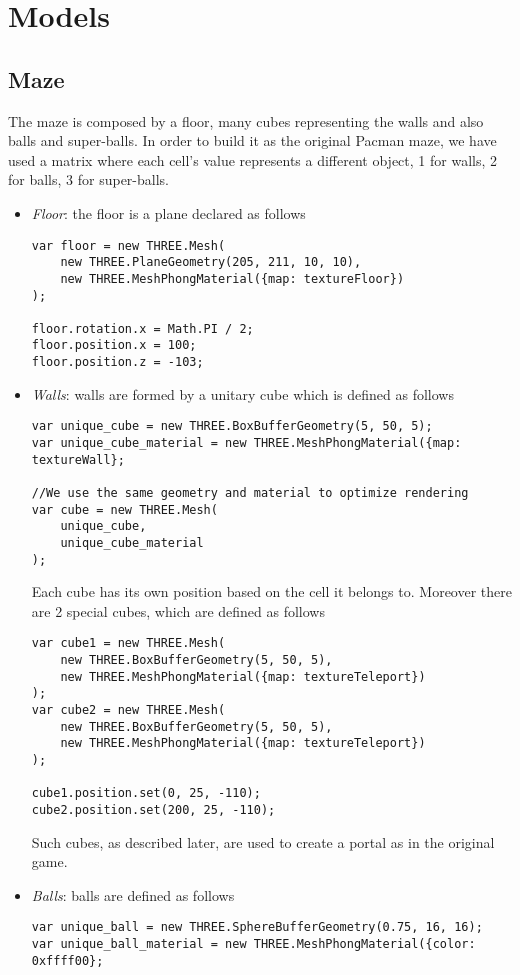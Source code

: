 \documentclass[a4paper,oneside]{report}
\begin{document}
\chapter{Models}
\section{Maze}
The maze is composed by a floor, many cubes representing the walls and also balls and super-balls. In order to build it as the original Pacman maze, we have used a matrix where each cell's value represents a different object, 1 for walls, 2 for balls, 3 for super-balls.
\begin{itemize}
\item \textit{Floor}: the floor is a plane declared as follows
\begin{lstlisting}
var floor = new THREE.Mesh(
	new THREE.PlaneGeometry(205, 211, 10, 10),
	new THREE.MeshPhongMaterial({map: textureFloor})
);

floor.rotation.x = Math.PI / 2;
floor.position.x = 100;
floor.position.z = -103;
\end{lstlisting}

\item \textit{Walls}: walls are formed by a unitary cube which is defined as follows
\begin{lstlisting}
var unique_cube = new THREE.BoxBufferGeometry(5, 50, 5);
var unique_cube_material = new THREE.MeshPhongMaterial({map: textureWall};

//We use the same geometry and material to optimize rendering
var	cube = new THREE.Mesh(
	unique_cube,
	unique_cube_material
);

\end{lstlisting}
Each cube has its own position based on the cell it belongs to. Moreover there are 2 special cubes, which are defined as follows
\begin{lstlisting}
var	cube1 = new THREE.Mesh(
	new THREE.BoxBufferGeometry(5, 50, 5),
	new THREE.MeshPhongMaterial({map: textureTeleport})
);
var	cube2 = new THREE.Mesh(
	new THREE.BoxBufferGeometry(5, 50, 5),
	new THREE.MeshPhongMaterial({map: textureTeleport})
);

cube1.position.set(0, 25, -110);
cube2.position.set(200, 25, -110);
\end{lstlisting}

Such cubes, as described later, are used to create a portal as in the original game.

\item \textit{Balls}: balls are defined as follows
\begin{lstlisting}
var unique_ball = new THREE.SphereBufferGeometry(0.75, 16, 16);
var unique_ball_material = new THREE.MeshPhongMaterial({color: 0xffff00};


\end{lstlisting}
\end{itemize}
\end{document}
